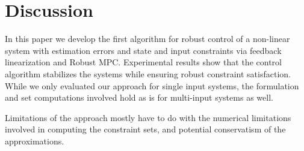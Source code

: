 \section{Discussion}
\label{sec:discussion}
In this paper we develop the first algorithm for robust control of a non-linear system with estimation errors and state and input constraints via feedback linearization and Robust MPC. 
Experimental results show that the control algorithm stabilizes the systems while ensuring robust constraint satisfaction.%
While we only evaluated our approach for single input systems, the formulation and set computations involved hold as is for multi-input systems as well.

Limitations of the approach mostly have to do with the numerical limitations involved in computing the constraint sets, and potential conservatism of the approximations.



